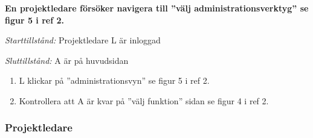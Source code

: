 \documentclass[a4paper]{article}
\begin{document}
\begin{FT}
\item %
\textbf{En projektledare försöker navigera till ''välj administrationsverktyg'' se figur 5 i ref 2.}

\emph{Starttillstånd:} Projektledare L är inloggad

\emph{Sluttillstånd:} A är på huvudsidan 

\begin{enumerate}
\item L klickar på ''administrationsvyn'' se figur 5 i ref 2.
\item Kontrollera att A är kvar på ''välj funktion'' sidan se figur 4 i ref 2.

\end{enumerate}
\end{FT}

\subsubsection{Projektledare}
\end{document}
